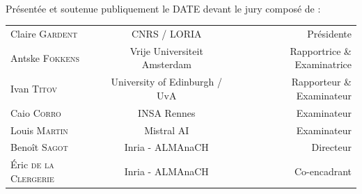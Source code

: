 \begin{titlepage}
\begin{center}
		\hrulefill\\

		\vspace{0.cm}
		\normalsize Présentée et soutenue publiquement le DATE devant le jury composé de :\\
		\vspace{0.4cm}
		\begin{tabular*}{\linewidth}{l c r}
			Claire \textsc{Gardent} & CNRS / LORIA & Présidente \\
			Antske \textsc{Fokkens} & Vrije Universiteit Amsterdam & Rapportrice \& Examinatrice \\
			Ivan \textsc{Titov} & University of Edinburgh / UvA & Rapporteur \& Examinateur \\
			Caio \textsc{Corro} & INSA Rennes & Examinateur \\
			Louis \textsc{Martin} & Mistral AI & Examinateur \\
			Benoît \textsc{Sagot} & Inria - ALMAnaCH & Directeur\\
			Éric \textsc{de la Clergerie} & Inria - ALMAnaCH & Co-encadrant
		\end{tabular*}
	\end{center}

\end{titlepage}


\newpage
\null
\thispagestyle{empty}
\newpage
